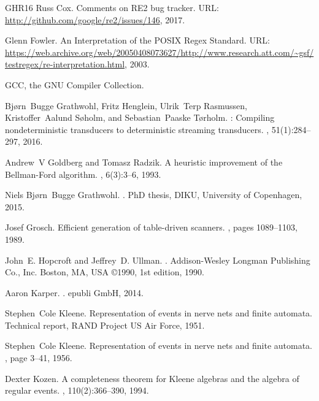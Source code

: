 \documentclass{article}
\theoremstyle{definition}
\begin{document}
\begin{thebibliography}{GHR{\etalchar{+}}16}
Russ Cox.
\newblock Comments on {RE2} bug tracker.
\newblock URL: \url{http://github.com/google/re2/issues/146}, 2017.

Glenn Fowler.
\newblock An {I}nterpretation of the {POSIX} {R}egex {S}tandard.
\newblock URL:
  \url{https://web.archive.org/web/20050408073627/http://www.research.att.com/~gsf/testregex/re-interpretation.html},
  2003.

{GCC}, the {GNU} {C}ompiler {C}ollection.

Bj{\o}rn~Bugge Grathwohl, Fritz Henglein, Ulrik~Terp Rasmussen,
  Kristoffer~Aalund S{\o}holm, and Sebastian~Paaske T{\o}rholm.
: Compiling nondeterministic transducers to deterministic
  streaming transducers.
, 51(1):284--297, 2016.

Andrew~V Goldberg and Tomasz Radzik.
\newblock A heuristic improvement of the {Bellman-Ford} algorithm.
, 6(3):3--6, 1993.

Niels Bj{\o}rn~Bugge Grathwohl.
.
\newblock PhD thesis, DIKU, University of Copenhagen, 2015.

Josef Grosch.
\newblock Efficient generation of table-driven scanners.
, pages 1089--1103, 1989.

John~E. Hopcroft and Jeffrey~D. Ullman.
.
\newblock Addison-Wesley Longman Publishing Co., Inc. Boston, MA, USA ©1990,
  1st edition, 1990.

Aaron Karper.
.
\newblock epubli GmbH, 2014.

Stephen~Cole Kleene.
\newblock Representation of events in nerve nets and finite automata.
\newblock Technical report, RAND Project US Air Force, 1951.

Stephen~Cole Kleene.
\newblock Representation of events in nerve nets and finite automata.
, page
  3–41, 1956.

Dexter Kozen.
\newblock A completeness theorem for {Kleene} algebras and the algebra of
  regular events.
, 110(2):366--390, 1994.


\end{thebibliography}
\end{document}
